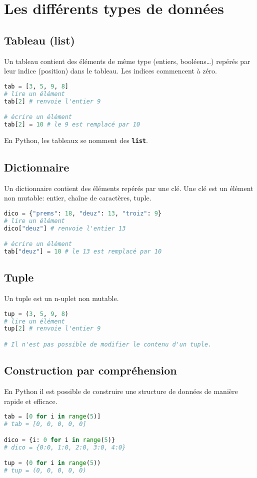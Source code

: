 \documentclass[a4paper,11pt]{article}
\begin{document}
\section{Les différents types de données}
\subsection{Tableau (list)}
Un tableau contient des éléments de même type (entiers, booléens\dots) repérés par leur indice (position) dans le tableau. Les indices commencent à zéro.
\begin{lstlisting}[language=Python  , xleftmargin=2em, xrightmargin=2em]
tab = [3, 5, 9, 8]
# lire un élément
tab[2] # renvoie l'entier 9

# écrire un élément
tab[2] = 10 # le 9 est remplacé par 10
\end{lstlisting}
En Python, les tableaux se nomment des \textbf{\texttt{list}}.
\subsection{Dictionnaire}
Un dictionnaire contient des éléments repérés par une clé. Une clé est un élément non mutable: entier, chaîne de caractères, tuple.
\begin{lstlisting}[language=Python  , xleftmargin=2em, xrightmargin=2em]
dico = {"prems": 18, "deuz": 13, "troiz": 9}
# lire un élément
dico["deuz"] # renvoie l'entier 13

# écrire un élément
tab["deuz"] = 10 # le 13 est remplacé par 10
\end{lstlisting}
\subsection{Tuple}
Un tuple est un n-uplet non mutable.
\begin{lstlisting}[language=Python  , xleftmargin=2em, xrightmargin=2em]
tup = (3, 5, 9, 8)
# lire un élément
tup[2] # renvoie l'entier 9

# Il n'est pas possible de modifier le contenu d'un tuple.
\end{lstlisting}
\subsection{Construction par compréhension}
En Python il est possible de construire une structure de données de manière rapide et efficace.
\begin{center}
    \begin{lstlisting}[language=Python  , xleftmargin=2em, xrightmargin=2em]
tab = [0 for i in range(5)]
# tab = [0, 0, 0, 0, 0]

dico = {i: 0 for i in range(5)}
# dico = {0:0, 1:0, 2:0, 3:0, 4:0}

tup = (0 for i in range(5))
# tup = (0, 0, 0, 0, 0)
\end{lstlisting}
    \label{CODE}
\end{center}
\end{document}
